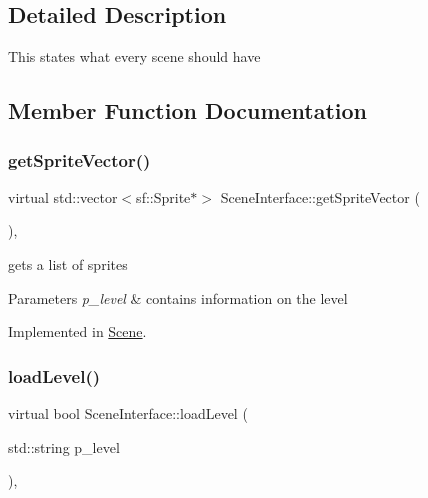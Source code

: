 \subsection{Detailed Description}
This states what every scene should have 

\subsection{Member Function Documentation}
\mbox{\label{class_scene_interface_af4cdfa0df6cbbba34d66870ea83b2a0a}} 
\subsubsection{\texorpdfstring{get\+Sprite\+Vector()}{getSpriteVector()}}
{\footnotesize\ttfamily virtual std\+::vector$<$sf\+::\+Sprite$\ast$$>$ Scene\+Interface\+::get\+Sprite\+Vector (\begin{DoxyParamCaption}{ }\end{DoxyParamCaption})\hspace{0.3cm}{\ttfamily [protected]}, {}}



gets a list of sprites 


\begin{DoxyParams}{Parameters}
{\em p\+\_\+level} & contains information on the level \\
\hline
\end{DoxyParams}


Implemented in \mbox{\hyperlink{class_scene_a595b66ffbd3efe4a0dd40f704a84c378}{Scene}}.

\mbox{\label{class_scene_interface_a54c0b8784bcb2278aeb9b6030df9a158}} 
\subsubsection{\texorpdfstring{load\+Level()}{loadLevel()}}
{\footnotesize\ttfamily virtual bool Scene\+Interface\+::load\+Level (\begin{DoxyParamCaption}\item[{std\+::string}]{p\+\_\+level }\end{DoxyParamCaption})\hspace{0.3cm}{\ttfamily [protected]}, {}}



